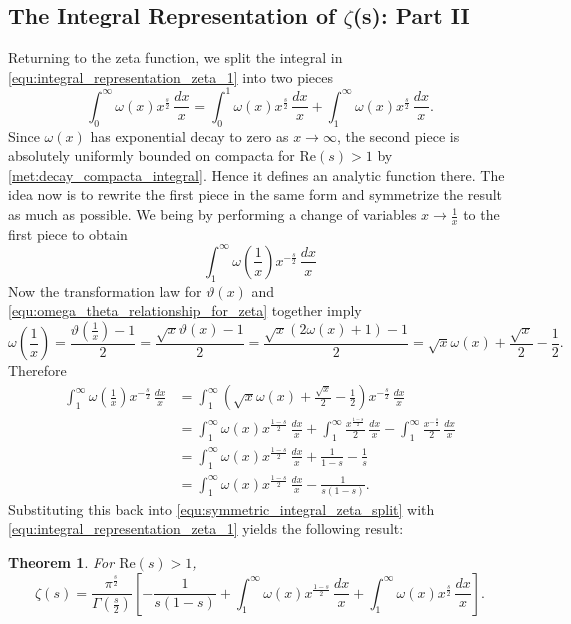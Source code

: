 \documentclass[12pt]{book}
\newtheorem{theorem}{Theorem}[section]
\theoremstyle{definition}\newframedtheorem{method}{Method}
\newcommand{\z}{\zeta}
\newcommand{\w}{\omega}
\newcommand{\G}{\Gamma}
\newcommand{\vt}{\vartheta}
\newcommand{\<}{\langle}
\renewcommand{\>}{\rangle}
\renewcommand{\Re}{\mathrm{Re}}
\begin{document}
    \subsection*{The Integral Representation of \texorpdfstring{$\z$}{z}(s): Part II}
      Returning to the zeta function, we split the integral in \cref{equ:integral_representation_zeta_1} into two pieces
      \begin{equation}\label{equ:symmetric_integral_zeta_split}
        \int_{0}^{\infty}\w(x)x^{\frac{s}{2}}\,\frac{dx}{x} = \int_{0}^{1}\w(x)x^{\frac{s}{2}}\,\frac{dx}{x}+\int_{1}^{\infty}\w(x)x^{\frac{s}{2}}\,\frac{dx}{x}.
      \end{equation}
      Since $\w(x)$ has exponential decay to zero as $x \to \infty$, the second piece is absolutely uniformly bounded on compacta for $\Re(s) > 1$ by \cref{met:decay_compacta_integral}. Hence it defines an analytic function there. The idea now is to rewrite the first piece in the same form and symmetrize the result as much as possible. We being by performing a change of variables $x \to \frac{1}{x}$ to the first piece to obtain
      \[
        \int_{1}^{\infty}\w\left(\frac{1}{x}\right)x^{-\frac{s}{2}}\,\frac{dx}{x}
      \]
      Now the transformation law for $\vt(x)$ and \cref{equ:omega_theta_relationship_for_zeta} together imply
      \[
        \w\left(\frac{1}{x}\right) = \frac{\vt\left(\frac{1}{x}\right)-1}{2} = \frac{\sqrt{x}\vt(x)-1}{2} = \frac{\sqrt{x}(2\w(x)+1)-1}{2} = \sqrt{x}\w(x)+\frac{\sqrt{x}}{2}-\frac{1}{2}.
      \]
      Therefore
      \begin{align*}
        \int_{1}^{\infty}\w\left(\frac{1}{x}\right)x^{-\frac{s}{2}}\,\frac{dx}{x} &= \int_{1}^{\infty}\left(\sqrt{x}\w(x)+\frac{\sqrt{x}}{2}-\frac{1}{2}\right)x^{-\frac{s}{2}}\,\frac{dx}{x} \\
        &= \int_{1}^{\infty}\w(x)x^{\frac{1-s}{2}}\,\frac{dx}{x}+\int_{1}^{\infty}\frac{x^{\frac{1-s}{2}}}{2}\,\frac{dx}{x}-\int_{1}^{\infty}\frac{x^{-\frac{s}{2}}}{2}\,\frac{dx}{x} \\
        &= \int_{1}^{\infty}\w(x)x^{\frac{1-s}{2}}\,\frac{dx}{x}+\frac{1}{1-s}-\frac{1}{s} \\
        &= \int_{1}^{\infty}\w(x)x^{\frac{1-s}{2}}\,\frac{dx}{x}-\frac{1}{s(1-s)}.
      \end{align*}
      Substituting this back into \cref{equ:symmetric_integral_zeta_split} with \cref{equ:integral_representation_zeta_1} yields the following result:

      \begin{theorem}
        For $\Re(s) > 1$,
        \[
          \z(s) = \frac{\pi^{\frac{s}{2}}}{\G\left(\frac{s}{2}\right)}\left[-\frac{1}{s(1-s)}+\int_{1}^{\infty}\w(x)x^{\frac{1-s}{2}}\,\frac{dx}{x}+\int_{1}^{\infty}\w(x)x^{\frac{s}{2}}\,\frac{dx}{x}\right].
        \]
      \end{theorem}
\end{document}
